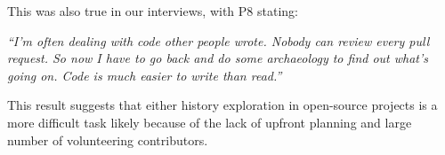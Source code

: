This was also true in our interviews, with P8 stating:

\begin{displayquote}
\textit{``I'm often dealing with code other people wrote. Nobody can review every pull request. So now I have to go back and do some archaeology to find out what's going on. Code is much easier to write than read.''}
\end{displayquote}

This result suggests that either history exploration in open-source projects is a more difficult task likely because of the lack of upfront planning and large number of volunteering contributors.

